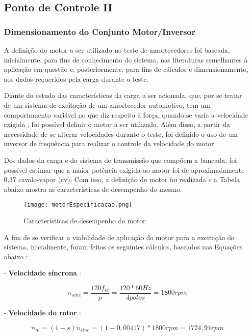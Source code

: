 \subsection{Ponto de Controle II}
\subsubsection{Dimensionamento do Conjunto Motor/Inversor}

	A definição do motor a ser utilizado no teste de amortecedores foi baseada, inicialmente, para fins de conhecimento do sistema, nas literaturas \cite{Duarte}\cite{Vandresen} semelhantes à aplicação em questão e, posteriormente, para fins de cálculos e dimensionamento, aos dados requeridos pela carga durante o teste. 
	
	Diante do estudo das características da carga a ser acionada, que, por se tratar de um sistema de excitação de um amortecedor automotivo, tem um comportamento variável no que diz respeito à força, quando se varia a velocidade exigida \cite{Duarte}, foi possível definir o motor a ser utilizado. Além disso, a partir da necessidade de se alterar velocidades durante o teste, foi definido o uso de um inversor de frequência para realizar o controle da velocidade do motor.
	
	Dos dados da carga e do sistema de transmissão que compõem a bancada, foi possível estimar que a maior potência exigida ao motor foi de aproximadamente 0,37 cavalo-vapor (cv). Com isso, a definição do motor foi realizada e a Tabela abaixo mostra as características de desempenho do mesmo.

	\newpage
	\begin{figure}[!h]
		\centering
		\texttt{[image: motorEspecificacao.png]}
		\caption[Características de desempenho do motor]{Características de desempenho do motor \cite{Voges}}
		\label{motorEspecificacao}
	\end{figure}

	A fim de se verificar a viabilidade de aplicação do motor para a excitação do sistema, inicialmente, foram feitos os seguintes cálculos, baseados nas Equações abaixo \cite{Chapman}:

	- \textbf{Velocidade síncrona} :

	$$ n_{sinc} = \frac{120f_{se}}{p} = \frac{120*60Hz}{4 polos} = 1800rpm $$

	- \textbf{Velocidade do rotor} :

	$$ n_{m} = (1 - s)n_{sinc} = (1 - 0,00417) * 1800rpm = 1724,94rpm $$

